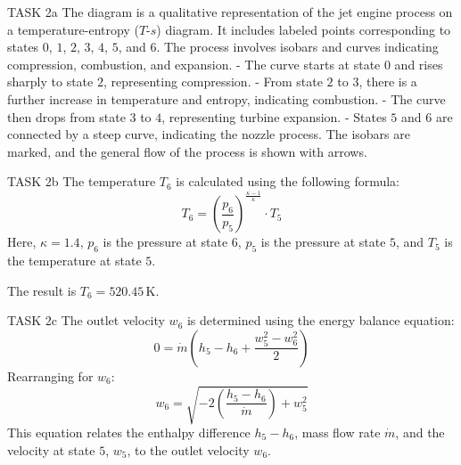 TASK 2a  
The diagram is a qualitative representation of the jet engine process on a temperature-entropy (\( T \)-\( s \)) diagram. It includes labeled points corresponding to states \( 0 \), \( 1 \), \( 2 \), \( 3 \), \( 4 \), \( 5 \), and \( 6 \). The process involves isobars and curves indicating compression, combustion, and expansion.  
- The curve starts at state \( 0 \) and rises sharply to state \( 2 \), representing compression.  
- From state \( 2 \) to \( 3 \), there is a further increase in temperature and entropy, indicating combustion.  
- The curve then drops from state \( 3 \) to \( 4 \), representing turbine expansion.  
- States \( 5 \) and \( 6 \) are connected by a steep curve, indicating the nozzle process.  
The isobars are marked, and the general flow of the process is shown with arrows.  

TASK 2b  
The temperature \( T_6 \) is calculated using the following formula:  
\[
T_6 = \left( \frac{p_6}{p_5} \right)^{\frac{\kappa - 1}{\kappa}} \cdot T_5
\]  
Here, \( \kappa = 1.4 \), \( p_6 \) is the pressure at state \( 6 \), \( p_5 \) is the pressure at state \( 5 \), and \( T_5 \) is the temperature at state \( 5 \).  

The result is \( T_6 = 520.45 \, \text{K} \).  

TASK 2c  
The outlet velocity \( w_6 \) is determined using the energy balance equation:  
\[
0 = \dot{m} \left( h_5 - h_6 + \frac{w_5^2 - w_6^2}{2} \right)
\]  
Rearranging for \( w_6 \):  
\[
w_6 = \sqrt{-2 \left( \frac{h_5 - h_6}{\dot{m}} \right) + w_5^2}
\]  
This equation relates the enthalpy difference \( h_5 - h_6 \), mass flow rate \( \dot{m} \), and the velocity at state \( 5 \), \( w_5 \), to the outlet velocity \( w_6 \).